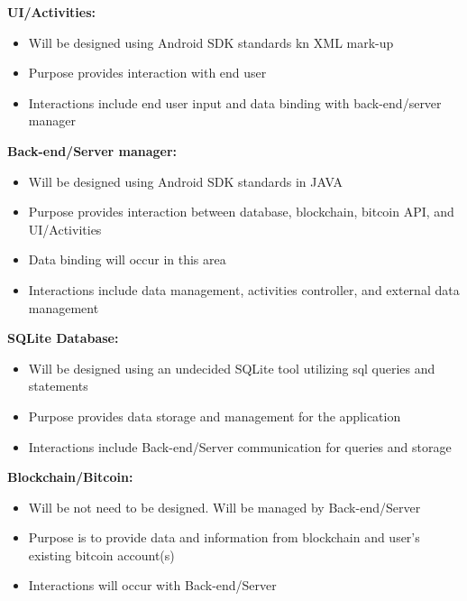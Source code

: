 \textbf{UI/Activities:}\\
\begin{itemize}
\item Will be designed using Android SDK standards kn XML mark-up 
\item Purpose provides interaction with end user
\item Interactions include end user input and data binding with back-end/server manager\\
\end{itemize}

\textbf{Back-end/Server manager:}\\
\begin{itemize}
\item Will be designed using Android SDK standards in JAVA
\item Purpose provides interaction between database, blockchain, bitcoin API, and UI/Activities
\item Data binding will occur in this area
\item Interactions include data management, activities controller, and external data management\\
\end{itemize}

\textbf{SQLite Database:}\\
\begin{itemize}
\item Will be designed using an undecided SQLite tool utilizing sql queries and statements 
\item Purpose provides data storage and management for the application
\item Interactions include Back-end/Server communication for queries and storage\\
\end{itemize}

\textbf{Blockchain/Bitcoin:}\\
\begin{itemize}
\item Will be not need to be designed. Will be managed by Back-end/Server
\item Purpose is to provide data and information from blockchain and user's existing bitcoin account(s)
\item Interactions will occur with Back-end/Server\\
\end{itemize}

